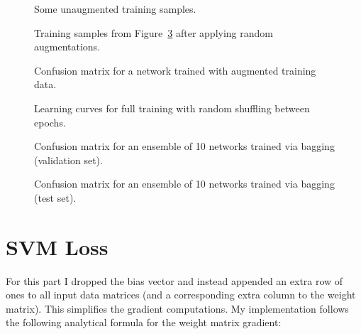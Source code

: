 \documentclass{article}
\begin{document}
\begin{figure}[H]
  \centering
  
  \caption{Some unaugmented training samples.}
  \label{fig:data_unaugmented}
\end{figure}

\begin{figure}[H]
  \centering
  
  \caption{Training samples from Figure~\ref{fig:confusion_matrix_augment} after
           applying random augmentations.}
  \label{fig:data_augmented}
\end{figure}

\begin{figure}[H]
  \centering
  
  \caption{Confusion matrix for a network trained with augmented training data.}
  \label{fig:confusion_matrix_augment}
\end{figure}

\begin{figure}[H]
  \centering
  
  \caption{Learning curves for full training with random shuffling between epochs.}
  \label{fig:learning_curves_shuffle}
\end{figure}

\begin{figure}[H]
  \centering
  
  \caption{Confusion matrix for an ensemble of 10 networks trained via bagging
           (validation set).}
  \label{fig:ensemble_performance_val}
\end{figure}

\begin{figure}[H]
  \centering
  
  \caption{Confusion matrix for an ensemble of 10 networks trained via bagging
           (test set).}
  \label{fig:ensemble_performance_test}
\end{figure}

\pagebreak

\section{SVM Loss}

For this part I dropped the bias vector and instead appended an extra row of
ones to all input data matrices (and a corresponding extra column to the weight
matrix). This simplifies the gradient computations. My implementation follows
the following analytical formula for the weight matrix gradient:
\end{document}

